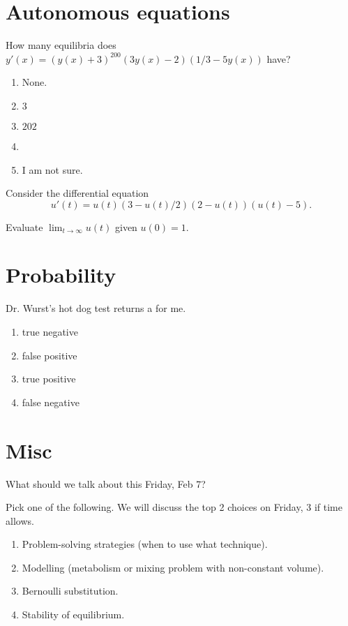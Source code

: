 \documentclass[t, 14pt]{beamer}
\begin{document}
\section{Autonomous equations}

\begin{frame}[t]
  How many equilibria does \(y'(x) = (y(x) + 3)^{200} (3y(x) - 2) (1/3 - 5y(x))\) have?

  \begin{enumerate}
    \item None.
    \item \(3\)
    \item \(202\)
    \item
    \item I am not sure.
  \end{enumerate}
\end{frame}


\begin{frame}[c]
  Consider the differential equation \[u'(t) = u(t)(3 - u(t)/2)(2 - u(t))(u(t) - 5).\]

  Evaluate \(\lim_{t \to \infty} u(t)\) given \(u(0) = 1\).
\end{frame}

\section{Probability}

\begin{frame}[t]
  Dr. Wurst's hot dog test returns a \underline{\hspace{2cm}} for me.

  \begin{enumerate}
    \item true negative
    \item false positive
    \item true positive
    \item false negative
  \end{enumerate}

\end{frame}

\section{Misc}

\begin{frame}[t]
  What should we talk about this Friday, Feb 7?

  Pick one of the following. We will discuss the top 2 choices on Friday, 3 if time allows. 
  \begin{enumerate}
    \item Problem-solving strategies (when to use what technique).
    \item Modelling (metabolism or mixing problem with non-constant volume).
    \item Bernoulli substitution.
    \item Stability of equilibrium.
  \end{enumerate}
\end{frame}
\end{document}
